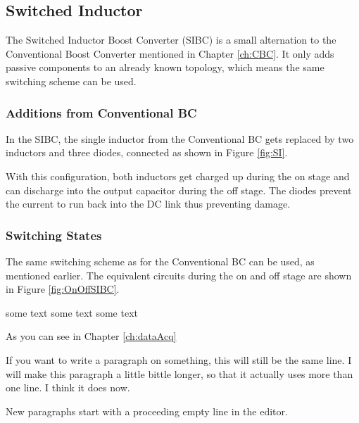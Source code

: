 
\subsection{Switched Inductor}\label{ch:SIBC}
The Switched Inductor Boost Converter (SIBC) is a small alternation to the Conventional Boost Converter mentioned in Chapter \ref{ch:CBC}.
It only adds passive components to an already known topology,
which means the same switching scheme can be used.
\subsubsection{Additions from Conventional BC}
In the SIBC,
the single inductor from the Conventional BC gets replaced by two inductors and three diodes,
connected as shown in Figure \ref{fig:SI}.

 \label{fig:SI}

With this configuration,
both inductors get charged up during the on stage
and can discharge into the output capacitor during the off stage.
The diodes prevent the current to run back into the DC link 
thus preventing damage.


\subsubsection{Switching States}
The same switching scheme as for the Conventional BC can be used,
as mentioned earlier.
The equivalent circuits during the on and off stage are shown in Figure \ref{fig:OnOffSIBC}.

\label{fig:OnOffSIBC}

some text
some text
some text

As you can see in Chapter \ref{ch:dataAcq}

If you want to write a paragraph on something,
this will still be the same line.
I will make this paragraph a little bittle longer,
so that it actually uses more than one line.
I think it does now.

New paragraphs start with a proceeding empty line in the editor.